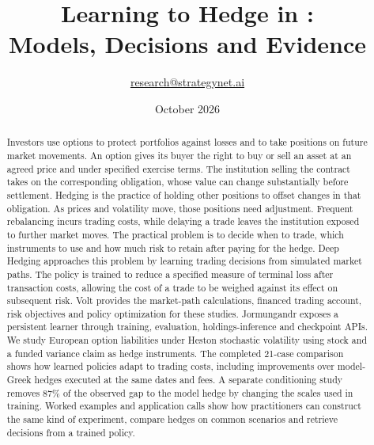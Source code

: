 \documentclass[8pt]{strategynet-journal}
\title{Learning to Hedge in \VOLT{}:\\Models, Decisions and Evidence}
\author{\href{mailto:research@strategynet.ai}{research@strategynet.ai}}
\date{October 2026}
\begin{document}
\maketitle
\begin{abstract}
\normalsize Investors use options to protect portfolios against losses and to take positions on future market movements. An option gives its buyer the right to buy or sell an asset at an agreed price and under specified exercise terms. The institution selling the contract takes on the corresponding obligation, whose value can change substantially before settlement. Hedging is the practice of holding other positions to offset changes in that obligation. As prices and volatility move, those positions need adjustment. Frequent rebalancing incurs trading costs, while delaying a trade leaves the institution exposed to further market moves. The practical problem is to decide when to trade, which instruments to use and how much risk to retain after paying for the hedge. Deep Hedging approaches this problem by learning trading decisions from simulated market paths. The policy is trained to reduce a specified measure of terminal loss after transaction costs, allowing the cost of a trade to be weighed against its effect on subsequent risk. Volt provides the market-path calculations, financed trading account, risk objectives and policy optimization for these studies. Jormungandr exposes a persistent learner through training, evaluation, holdings-inference and checkpoint APIs. We study European option liabilities under Heston stochastic volatility using stock and a funded variance claim as hedge instruments. The completed 21-case comparison shows how learned policies adapt to trading costs, including improvements over model-Greek hedges executed at the same dates and fees. A separate conditioning study removes 87\% of the observed gap to the model hedge by changing the scales used in training. Worked examples and application calls show how practitioners can construct the same kind of experiment, compare hedges on common scenarios and retrieve decisions from a trained policy.
\end{abstract}
\SNtwocolumntableofcontents
\end{document}
